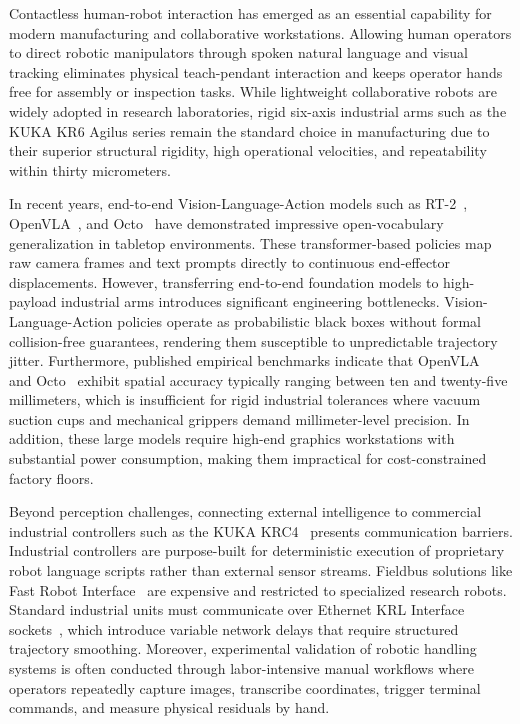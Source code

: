 \documentclass[runningheads]{llncs}
\begin{document}
Contactless human-robot interaction has emerged as an essential capability for modern manufacturing and collaborative workstations. Allowing human operators to direct robotic manipulators through spoken natural language and visual tracking eliminates physical teach-pendant interaction and keeps operator hands free for assembly or inspection tasks. While lightweight collaborative robots are widely adopted in research laboratories, rigid six-axis industrial arms such as the KUKA KR6 Agilus series remain the standard choice in manufacturing due to their superior structural rigidity, high operational velocities, and repeatability within thirty micrometers.

In recent years, end-to-end Vision-Language-Action models such as RT-2~\cite{rt2_2023}, OpenVLA~\cite{openvla2024}, and Octo~\cite{octo2024} have demonstrated impressive open-vocabulary generalization in tabletop environments. These transformer-based policies map raw camera frames and text prompts directly to continuous end-effector displacements. However, transferring end-to-end foundation models to high-payload industrial arms introduces significant engineering bottlenecks. Vision-Language-Action policies operate as probabilistic black boxes without formal collision-free guarantees, rendering them susceptible to unpredictable trajectory jitter. Furthermore, published empirical benchmarks indicate that OpenVLA~\cite{openvla2024} and Octo~\cite{octo2024} exhibit spatial accuracy typically ranging between ten and twenty-five millimeters, which is insufficient for rigid industrial tolerances where vacuum suction cups and mechanical grippers demand millimeter-level precision. In addition, these large models require high-end graphics workstations with substantial power consumption, making them impractical for cost-constrained factory floors.

Beyond perception challenges, connecting external intelligence to commercial industrial controllers such as the KUKA KRC4~\cite{kuka_kss2018} presents communication barriers. Industrial controllers are purpose-built for deterministic execution of proprietary robot language scripts rather than external sensor streams. Fieldbus solutions like Fast Robot Interface~\cite{lbr_stack2024} are expensive and restricted to specialized research robots. Standard industrial units must communicate over Ethernet KRL Interface sockets~\cite{kuka_eki_eval2022}, which introduce variable network delays that require structured trajectory smoothing. Moreover, experimental validation of robotic handling systems is often conducted through labor-intensive manual workflows where operators repeatedly capture images, transcribe coordinates, trigger terminal commands, and measure physical residuals by hand.
\end{document}
